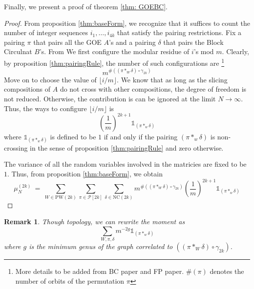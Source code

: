 \documentclass{article}
\newcommand{\PW}{\text{PW}}
\newcommand{\NC}{\text{NC}}
\newtheorem{remark}{Remark}
\begin{document}
Finally, we present a proof of theorem \ref{thm: GOEBC}.
\begin{proof} 
    From proposition \ref{thm:baseForm}, we recognize that 
    it suffices to count the number of integer sequences 
    $i_1, \dots, i_{4k}$ that satisfy the pairing restrictions. 
    Fix a pairing $\pi$ that pairs all the GOE $A$'s and a
    pairing $\delta$  that pairs the Block Circulnat $B$'s. 
    From 
    We first configure the modular residue of $i$'s mod $m$. 
    Clearly, by proposition \ref{thm:pairingRule}, the number of such configurations are \footnote{More details to be added 
    from BC paper and FP paper. $\#(\pi)$ denotes the number of orbits of the permutation $\pi$} 
    \[
    m^{
        \# ((\pi *_W \delta)\circ \gamma_{2k})
    }
    \]
    Move on to 
    choose the value of $\lfloor i / m \rfloor$. 
    We know that as long as the slicing compositions of $A$ do 
    not cross with other compositions, the degree of freedom 
    is not reduced. Otherwise, the contribution is can be ignored 
    at the limit $N \rightarrow \infty$. Thus, the ways to configure 
$\lfloor i / m \rfloor$ is 
\begin{equation}
        \left(
            \frac 1 m
        \right)^{2k + 1}
        \mathbb{1}_{(\pi*_w\delta)}
\end{equation}
where $\mathbb{1}_{(\pi*_w\delta)}$ is defined to be $1$ if and only if 
the pairing $(\pi*_w\delta)$ is non-crossing in the sense of proposition 
\ref{thm:pairingRule} and zero otherwise. 

The variance of all the random variables involved in the matricies are 
fixed to be $1$. Thus, from proposition \ref{thm:baseForm}, we obtain 
\label{thm: GOEBC}
    \begin{equation}
        \mu_N^{(2k)} \ = \ 
        \sum_{W \in \PW(2k)}
        \sum_{\pi \in \mathcal P[2k]}  
        \sum_{\delta \in \NC(2k)}   
        m^{
            \#((\pi *_W \delta) \circ \gamma_{2k} )
        }
        \left(
            \frac 1 m
        \right)^{2k + 1}
        \mathbb{1}_{(\pi*_w\delta)}
    \end{equation}
\end{proof}



\begin{remark}
    Though topology, we can rewrite the moment as
    \begin{equation}
        \sum_{W, \pi, \delta} m^{-2g} \mathbb{1}_{(\pi*_w\delta)}
    \end{equation}
    where $g$ is the minimum genus of the graph correlated to 
    $((\pi *_W \delta) \circ \gamma_{2k} )$. 
\end{remark}
\end{document}
